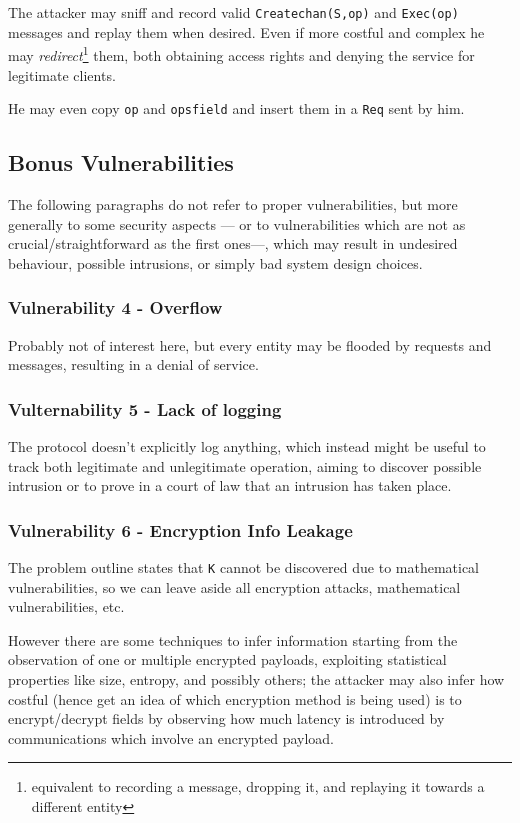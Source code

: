 The attacker may sniff and record valid \texttt{Createchan(S,op)} and \texttt{Exec(op)} messages and replay them when desired.
Even if more costful and complex he may \textit{redirect}\footnote{equivalent to recording a message, dropping it, and replaying it towards a different entity} them,
both obtaining access rights and denying the service for legitimate clients.

He may even copy \texttt{op} and \texttt{opsfield} and insert them in a \texttt{Req} sent by him.

\subsection{Bonus Vulnerabilities}
The following paragraphs do not refer to proper vulnerabilities,
but more generally to some security aspects  {---} or to vulnerabilities which are not as crucial/straightforward as the first ones{---}, which may result in undesired behaviour, possible intrusions, or simply bad system design choices.

\subsubsection{Vulnerability 4 - Overflow}
Probably not of interest here,
but every entity may be flooded by requests and messages,
resulting in a denial of service.

\subsubsection{Vulternability 5 - Lack of logging}
The protocol doesn't explicitly log anything,
which instead might be useful to track both legitimate and unlegitimate operation,
aiming to discover possible intrusion or to prove in a court of law that an intrusion has taken place.

\subsubsection{Vulnerability 6 - Encryption Info Leakage}
The problem outline states that \texttt{K} cannot be discovered due to mathematical vulnerabilities,
so we can leave aside all encryption attacks, mathematical vulnerabilities, etc.

However there are some techniques to infer information starting from the observation of one or multiple encrypted payloads,
exploiting statistical properties like size, entropy, and possibly others;
the attacker may also infer how costful (hence get an idea of which encryption method is being used) is to encrypt/decrypt fields by observing how much latency is introduced by communications which involve an encrypted payload.

